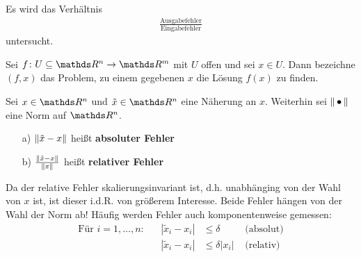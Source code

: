  \label{3.2}
Es wird das Verhältnis 
\begin{gather*}
  \frac{\text{Ausgabefehler}}{\text{Eingabefehler}}
\end{gather*}
untersucht.

\begin{Defe}
  \label{3.2.1} 
  Sei $f\colon U \subseteq \R^n \to \R^m$ mit $U$ offen und sei $x\in U$.
  Dann bezeichne $(f, x)$ das Problem, 
  zu einem gegebenen $x$ die Lösung $f(x)$ zu finden.
\end{Defe}

\begin{Defe}
  \label{3.2.2} 
  Sei $x\in\R^n$ und $\tilde{x} \in \R^n$ eine Näherung an $x$. 
  Weiterhin sei $\nn$ eine Norm auf $\R^n$.
  \begin{itemize}
  \item[a)] $\nn[\tilde{x} - x]$ heißt \textbf{absoluter Fehler} 
  \item[b)] $\frac{\nn[\tilde{x} - x]}{\nn[x]}$ heißt \textbf{relativer Fehler}
  \end{itemize}
  Da der relative Fehler skalierungsinvariant ist, 
  d.h. unabhänging von der  Wahl von $x$ ist, ist dieser i.d.R. von größerem Interesse.
  Beide Fehler hängen von der Wahl der Norm ab!
  Häufig werden Fehler auch komponentenweise gemessen:
  \begin{align*}
    \text{Für } i=1,\dotsc , n : 
    && |\tilde{x}_i - x_i | & \leq \delta & \text{ (absolut)} \\
    && |\tilde{x}_i - x_i | &\leq \delta |x_i| & \text{ (relativ)}
  \end{align*}
\end{Defe}

